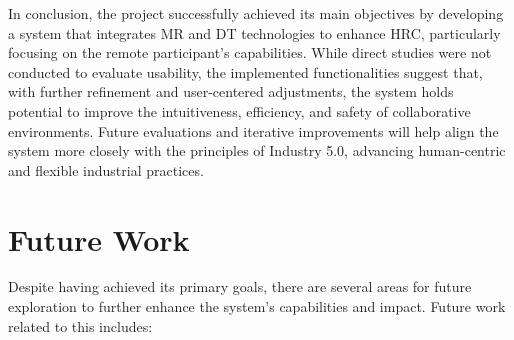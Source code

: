 In conclusion, the project successfully achieved its main objectives by developing a system that integrates \ac{MR} and \ac{DT} technologies to enhance \ac{HRC}, particularly focusing on the remote participant's capabilities. While direct studies were not conducted to evaluate usability, the implemented functionalities suggest that, with further refinement and user-centered adjustments, the system holds potential to improve the intuitiveness, efficiency, and safety of collaborative environments. Future evaluations and iterative improvements will help align the system more closely with the principles of Industry 5.0, advancing human-centric and flexible industrial practices.



\section{Future Work}

Despite having achieved its primary goals, there are several areas for future exploration to further enhance the system's capabilities and impact.
Future work related to this includes:

